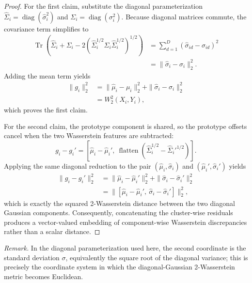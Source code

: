 \documentclass[journal]{IEEEtran}
\DeclareMathOperator{\flatten}{flatten}
\begin{document}
\begin{proof}
For the first claim, substitute the diagonal parameterization \(\hat{\Sigma}_i = \operatorname{diag}(\hat{\sigma}_i^2)\) and \(\Sigma_i = \operatorname{diag}(\sigma_i^2)\). Because diagonal matrices commute, the covariance term simplifies to
\begin{align}
\operatorname{Tr}\!\left(\hat{\Sigma}_i + \Sigma_i - 2\left(\hat{\Sigma}_i^{1/2}\Sigma_i\hat{\Sigma}_i^{1/2}\right)^{1/2}\right)
&= \sum_{d=1}^D (\hat{\sigma}_{id}-\sigma_{id})^2 \nonumber\\
&= \|\hat{\sigma}_i-\sigma_i\|_2^2.
\end{align}
Adding the mean term yields
\begin{align}
\|g_i\|_2^2
&= \|\hat{\mu}_i-\mu_i\|_2^2 + \|\hat{\sigma}_i-\sigma_i\|_2^2 \nonumber\\
&= W_2^2(X_i,Y_i),
\end{align}
which proves the first claim.

For the second claim, the prototype component is shared, so the prototype offsets cancel when the two Wasserstein features are subtracted:
\begin{equation}
g_i - g_i' = [\hat{\mu}_i-\hat{\mu}_i',\ \flatten(\hat{\Sigma}_i^{1/2}-\hat{\Sigma}_i'^{1/2})].
\end{equation}
Applying the same diagonal reduction to the pair \((\hat{\mu}_i,\hat{\sigma}_i)\) and \((\hat{\mu}_i',\hat{\sigma}_i')\) yields
\begin{align}
\|g_i-g_i'\|_2^2
&= \|\hat{\mu}_i-\hat{\mu}_i'\|_2^2 + \|\hat{\sigma}_i-\hat{\sigma}_i'\|_2^2 \nonumber\\
&= \|[\hat{\mu}_i-\hat{\mu}_i',\ \hat{\sigma}_i-\hat{\sigma}_i']\|_2^2,
\end{align}
which is exactly the squared 2-Wasserstein distance between the two diagonal Gaussian components. Consequently, concatenating the cluster-wise residuals produces a vector-valued embedding of component-wise Wasserstein discrepancies rather than a scalar distance.
\end{proof}

\noindent\textit{Remark.} In the diagonal parameterization used here, the second coordinate is the standard deviation \(\sigma\), equivalently the square root of the diagonal variance; this is precisely the coordinate system in which the diagonal-Gaussian 2-Wasserstein metric becomes Euclidean.
\end{document}

